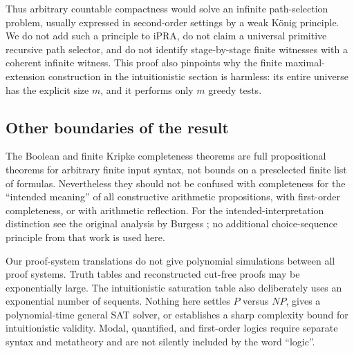 Thus arbitrary countable compactness would solve an infinite path-selection
problem, usually expressed in second-order settings by a weak K\"onig
principle. We do not add such a principle to iPRA, do not claim a universal
primitive recursive path selector, and do not identify stage-by-stage
finite witnesses with a coherent infinite witness. This proof also pinpoints
why the finite maximal-extension construction in the intuitionistic section
is harmless: its entire universe has the explicit size $m$, and it performs
only $m$ greedy tests.

\subsection{Other boundaries of the result}

The Boolean and finite Kripke completeness theorems are full propositional
theorems for arbitrary finite input syntax, not bounds on a preselected
finite list of formulas. Nevertheless they should not be confused with
completeness for the ``intended meaning'' of all constructive arithmetic
propositions, with first-order completeness, or with arithmetic reflection.
For the intended-interpretation distinction see the original analysis by
Burgess \cite{burgess1981}; no additional choice-sequence principle from
that work is used here.

Our proof-system translations do not give polynomial simulations between
all proof systems. Truth tables and reconstructed cut-free proofs may be
exponentially large. The intuitionistic saturation table also deliberately
uses an exponential number of sequents. Nothing here settles $P$ versus
$NP$, gives a polynomial-time general SAT solver, or establishes a sharp
complexity bound for intuitionistic validity. Modal, quantified, and
first-order logics require separate syntax and metatheory and are not
silently included by the word ``logic''.
